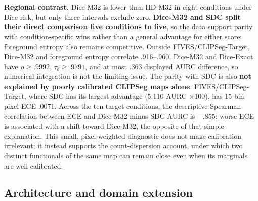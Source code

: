 \noindent\textbf{Regional contrast.}
Dice-M32 is lower than HD-M32 in eight conditions under Dice risk, but only
three intervals exclude zero. \textbf{Dice-M32 and SDC split their direct comparison
five conditions to five}, so the data support parity with condition-specific
wins rather than a general advantage for either score; foreground entropy also
remains competitive.
Outside FIVES/CLIPSeg-Target, Dice-M32 and foreground entropy correlate
.916--.960. Dice-M32 and Dice-Exact have \(\rho\geq.9992\),
\(\tau_b\geq.9791\), and at most .363 displayed AURC difference, so numerical
integration is not the limiting issue.
The parity with SDC is also \textbf{not explained by poorly calibrated CLIPSeg
maps alone}. FIVES/CLIPSeg-Target, where SDC has its largest advantage
(5.110 AURC \(\times100\)), has 15-bin pixel ECE .0071. Across the ten target
conditions, the descriptive Spearman correlation between ECE and
Dice-M32-minus-SDC AURC is \(-.855\): worse ECE is associated with a shift
toward Dice-M32, the opposite of that simple explanation. This small,
pixel-weighted diagnostic does not make calibration irrelevant; it instead
supports the count-dispersion account, under which two distinct functionals of
the same map can remain close even when its marginals are well calibrated.

\subsection{Architecture and domain extension}

